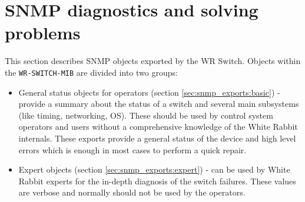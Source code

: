 \section{SNMP diagnostics and solving problems}
\label{sec:snmp_exports}
This section describes SNMP objects exported by the WR Switch. Objects within
the \texttt{WR\--SWITCH\--MIB} are divided into two groups:
\begin{itemize}
  \item General status objects for operators (section
    \ref{sec:snmp_exports:basic}) - provide a summary about the status of a
    switch and several main subsystems (like timing, networking, OS). These
    should be used by control system operators and users without a
    comprehensive knowledge of the White Rabbit internals. These exports provide
    a general status of the device and high level errors which is enough in most
    cases to perform a quick repair.

  \item Expert objects (section \ref{sec:snmp_exports:expert}) -
    can be used by White Rabbit experts for the in-depth diagnosis of the switch
    failures. These values are verbose and normally should not be used by the
    operators.
\end{itemize}

